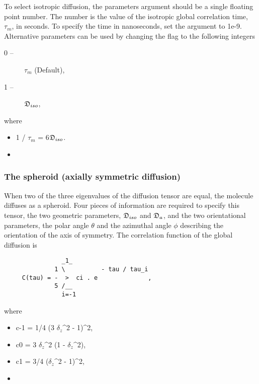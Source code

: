  To select isotropic diffusion, the parameters argument should be a single floating point number.  The number is the value of the isotropic global correlation time, $\tau_m$, in seconds. To specify the time in nanoseconds, set the  argument to 1e-9.  Alternative parameters can be used by changing the  flag to the following integers 
  

 \begin{description} 
 \item[0 --]  $\tau_m$   (Default),  
 \item[1 --]  $\mathfrak{D}_{iso}$,  
 \end{description} 
  

 where 
  

 \begin{itemize} 
 \item[] 1 / $\tau_m$ = 6$\mathfrak{D}_{iso}$.  
 \item[]  
 \end{itemize} 
  

  
 \subsubsection{The spheroid (axially symmetric diffusion)} 

 When two of the three eigenvalues of the diffusion tensor are equal, the molecule diffuses as a spheroid.  Four pieces of information are required to specify this tensor, the two geometric parameters, $\mathfrak{D}_{iso}$ and $\mathfrak{D}_a$, and the two orientational parameters, the polar angle $\theta$ and the azimuthal angle $\phi$ describing the orientation of the axis of symmetry.  The correlation function of the global diffusion is 
  

 {\footnotesize \begin{verbatim} 
                _1_ 
              1 \          - tau / tau_i 
     C(tau) = -  >  ci . e              , 
              5 /__ 
                i=-1 
 \end{verbatim}} 

 where 
  

 \begin{itemize} 
 \item[] c-1 = 1/4 (3 $\delta_z$\^{}2 - 1)\^{}2,  
 \item[] c0  = 3 $\delta_z$\^{}2 (1 - $\delta_z$\^{}2),  
 \item[] c1  = 3/4 ($\delta_z$\^{}2 - 1)\^{}2,  
 \item[]  
 \end{itemize} 
  

